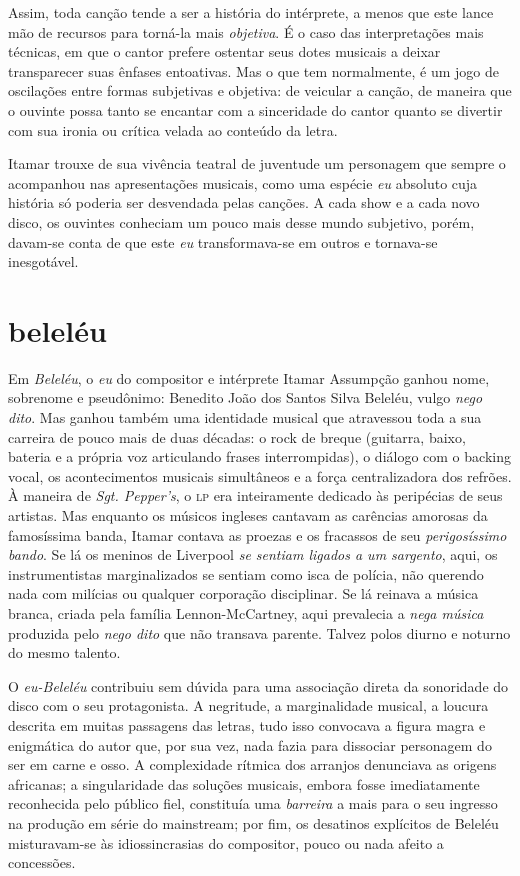 Assim, toda canção tende a ser a história do intérprete, a menos que
este lance mão de recursos para torná-la mais \textit{objetiva}. É o caso das
interpretações mais técnicas, em que o cantor prefere ostentar seus
dotes musicais a deixar transparecer suas ênfases entoativas. Mas o que
tem normalmente, é um jogo de oscilações entre formas subjetivas e
objetiva: de veicular a canção, de maneira que o ouvinte possa tanto se
encantar com a sinceridade do cantor quanto se divertir com sua ironia
ou crítica velada ao conteúdo da letra.

Itamar trouxe de sua vivência teatral de juventude um personagem que
sempre o acompanhou nas apresentações musicais, como uma espécie \textit{eu}
absoluto cuja história só poderia ser desvendada pelas canções. A cada
show e a cada novo disco, os ouvintes conheciam um pouco mais desse
mundo subjetivo, porém, davam-se conta de que este \textit{eu}
transformava-se em outros e tornava-se inesgotável.

\section{beleléu}

Em \textit{Beleléu}, o \textit{eu} do compositor e intérprete Itamar Assumpção ganhou
nome, sobrenome e pseudônimo: Benedito João dos Santos Silva Beleléu,
vulgo \textit{nego dito}. Mas ganhou também uma identidade musical que atravessou
toda a sua carreira de pouco mais de duas décadas: o rock de breque
(guitarra, baixo, bateria e a própria voz articulando frases
interrompidas), o diálogo com o backing vocal, os acontecimentos
musicais simultâneos e a força centralizadora dos refrões. À maneira de
\textit{Sgt. Pepper's}, o \textsc{lp} era inteiramente dedicado às peripécias de seus
artistas. Mas enquanto os músicos ingleses cantavam as carências
amorosas da famosíssima banda, Itamar contava as proezas e os fracassos
de seu \textit{perigosíssimo bando}. Se lá os meninos de Liverpool \textit{se
sentiam ligados a um sargento}, aqui, os instrumentistas marginalizados
se sentiam como isca de polícia, não querendo nada com milícias ou
qualquer corporação disciplinar. Se lá reinava a música branca, criada
pela família Lennon-McCartney, aqui prevalecia a \textit{nega música}
produzida pelo \textit{nego dito} que não transava parente. Talvez polos
diurno e noturno do mesmo talento.

O \textit{eu-Beleléu} contribuiu sem dúvida para uma associação direta
da sonoridade do disco com o seu protagonista. A negritude, a
marginalidade musical, a loucura descrita em muitas passagens das
letras, tudo isso convocava a figura magra e enigmática do autor que,
por sua vez, nada fazia para dissociar personagem do ser em carne e
osso. A complexidade rítmica dos arranjos denunciava as origens
africanas; a singularidade das soluções musicais, embora fosse
imediatamente reconhecida pelo público fiel, constituía uma \textit{barreira} a
mais para o seu ingresso na produção em série do mainstream; por fim, os
desatinos explícitos de Beleléu misturavam-se às idiossincrasias do
compositor, pouco ou nada afeito a concessões.

